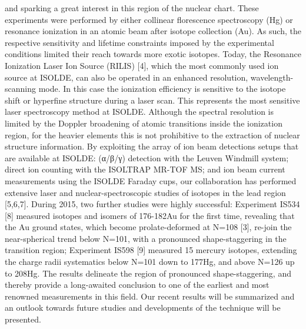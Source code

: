 and sparking a great interest in this region of the nuclear chart.  These experiments were performed by either collinear florescence spectroscopy (Hg) or resonance ionization in an atomic beam after isotope collection (Au).  As such, the respective sensitivity and lifetime constraints imposed by the experimental conditions limited their reach towards more exotic isotopes.  Today, the Resonance Ionization Laser Ion Source (RILIS) [4], which the most commonly used ion source at ISOLDE, can also be operated in an enhanced resolution, wavelength-scanning mode. In this case the ionization efficiency is sensitive to the isotope shift or hyperfine structure during a laser scan.  This represents the most sensitive laser spectroscopy method at ISOLDE. Although the spectral resolution is limited by the Doppler broadening of atomic transitions inside the ionization region, for the heavier elements this is not prohibitive to the extraction of nuclear structure information.  By exploiting the array of ion beam detections setups that are available at ISOLDE: (α/β/γ) detection with the Leuven Windmill system; direct ion counting with the ISOLTRAP MR-TOF MS; and ion beam current measurements using the ISOLDE Faraday cups, our collaboration has performed extensive laser and nuclear-spectroscopic studies of isotopes in the lead region [5,6,7].  During 2015, two further studies were highly successful: Experiment IS534 [8] measured isotopes and isomers of 176-182Au for the first time, revealing that the Au ground states, which become prolate-deformed at N=108 [3], re-join the near-spherical trend below N=101, with a pronounced shape-staggering in the transition region; Experiment IS598 [9] measured 15 mercury isotopes, extending the charge radii systematics below N=101 down to 177Hg, and above N=126 up to 208Hg.  The results delineate the region of pronounced shape-staggering, and thereby provide a long-awaited conclusion to one of the earliest and most renowned measurements in this field.   Our recent results will be summarized and an outlook towards future studies and developments of the technique will be presented.